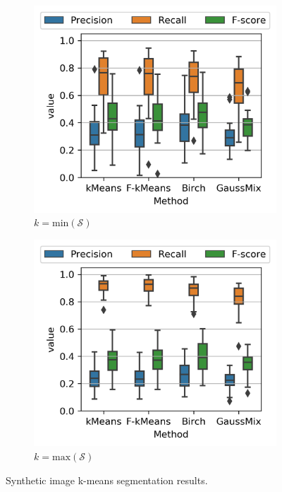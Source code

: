 \documentclass[journal]{IEEEtran}
\begin{document}
\begin{figure}[!t]
    \centering
    \begin{subfigure}[b]{0.24\textwidth}
        \includegraphics[width=\textwidth]{PrecisionRecall_boxplot_min_nclusters_LAB}
        \caption{$k=\mathrm{min}(\mathcal{S})$}
    \end{subfigure}   
    \begin{subfigure}[b]{0.24\textwidth}
    	\centering
    	\includegraphics[width=\textwidth]{PrecisionRecall_boxplot_max_nclusters_LAB}
        \caption{$k=\mathrm{max}(\mathcal{S})$}
    \end{subfigure}     
            	    
    \caption{Synthetic image k-means segmentation results.}\label{fig:PR_boxplot_scores_min_max_clusters}    
\end{figure}
\end{document}
